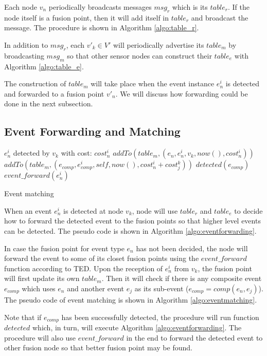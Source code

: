 Each node \(v_n\) periodically broadcasts messages \(msg_r\) which is its \(table_r\). If the node itself is a fusion point, then it will add itself in \(table_r\) and broadcast the message. The procedure is shown in Algorithm \ref{algo:table_r}.

In addition to \(msg_r\), each \(v'_k\in V'\) will periodically advertise its \(table_m\) by broadcasting \(msg_m\) so that other sensor nodes can construct their \(table_e\) with Algorithm \ref{algo:table_e}.

The construction of \(table_m\) will take place when the event instance \(e_n^i\) is detected and forwarded to a fusion point \(v'_n\). We will discuss how forwarding could be done in the next subsection.

\subsection{Event Forwarding and Matching}

\begin{algorithm}
\begin{algorithmic}[1]
\REQUIRE \(e_n^i\) detected by \(v_k\) with cost: \(cost_n^i\)
	\STATE \(addTo(table_m, (e_n, e_n^i, v_k, now(), cost_n^i))\)
					\STATE \(addTo(table_m, (e_{comp}, e_{comp}^i, self, now(), cost_n^i+cost_j^k))\)
					\STATE \(detected(e_{comp})\)
				\ENDIF
			\ENDFOR
		\ENDIF
	\ENDFOR
	\STATE \(event\_forward(e_n^i)\)
\end{algorithmic}
\caption{Event matching}
\label{algo:eventmatching}
\end{algorithm}

When an event \(e_n^i\) is detected at node \(v_k\), node will use \(table_r\) and \(table_e\) to decide how to forward the detected event to the fusion points so that higher level events can be detected. The pseudo code is shown in Algorithm \ref{algo:eventforwarding}.

In case the fusion point for event type \(e_n\) has not been decided, the node will forward the event to some of its closet fusion points using the \(event\_forward\) function according to TED. Upon the reception of \(e_n^i\) from \(v_k\), the fusion point will first update its own \(table_m\). Then it will check if there is any composite event \(e_{comp}\) which uses \(e_n\) and another event \(e_j\) as its sub-event (\(e_{comp}=comp(e_n, e_j)\)). The pseudo code of event matching is shown in Algorithm \ref{algo:eventmatching}.

Note that if \(e_{comp}\) has been successfully detected, the procedure will run function \(detected\) which, in turn, will execute Algorithm \ref{algo:eventforwarding}. The procedure will also use \(event\_forward\) in the end to forward the detected event to other fusion node so that better fusion point may be found.
